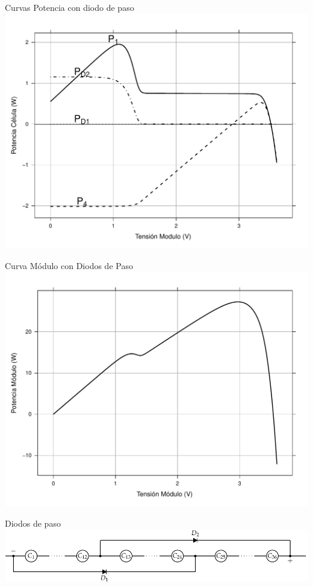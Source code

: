 \documentclass[xcolor={usenames,svgnames,dvipsnames}]{beamer}
\begin{document}
\begin{frame}[label=sec-1-3-7]{Curvas Potencia con diodo de paso}
\includegraphics[width=.9\linewidth]{../figs/PotenciaCelulas_DiodoPaso.pdf}
\end{frame}

\begin{frame}[label=sec-1-3-8]{Curva Módulo con Diodos de Paso}
\includegraphics[width=.9\linewidth]{../figs/PotenciaModulo.pdf}
\end{frame}

\begin{frame}[label=sec-1-3-9]{Diodos de paso}
\includegraphics[width=.9\linewidth]{../figs/AsociacionSerieCelulas_DiodosPasoAlternos.pdf}
\end{frame}
\end{document}
